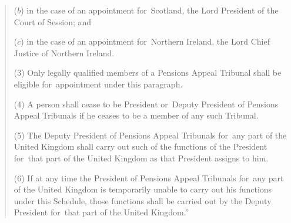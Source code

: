 \documentclass[12pt,a4paper]{article}
\begin{document}
\begin{quotation}
\begin{enumerate}
($b$) in the case of an appointment for~Scotland, the Lord President of the Court of Session; and

($c$) in the case of an appointment for~Northern Ireland, the Lord Chief Justice of Northern Ireland.
\end{enumerate}

(3) Only legally qualified members of a Pensions Appeal Tribunal shall be eligible for~appointment under this paragraph.

(4) A person shall cease to be President or~Deputy President of Pensions Appeal Tribunals if he ceases to be a member of any such Tribunal.

(5) The Deputy President of Pensions Appeal Tribunals for~any part of the United Kingdom shall carry out such of the functions of the President for~that part of the United Kingdom as that President assigns to him.

(6) If at any time the President of Pensions Appeal Tribunals for~any part of the United Kingdom is temporarily unable to carry out his functions under this Schedule, those functions shall be carried out by the Deputy President for~that part of the United Kingdom.”
\end{quotation}
\end{document}
